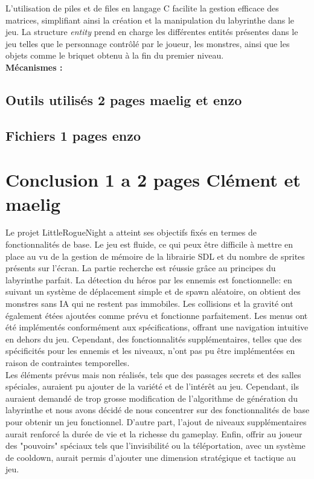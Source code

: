 \documentclass[10pt]{article}
\begin{document}
   L'utilisation de piles et de files en langage C facilite la gestion efficace des matrices, simplifiant ainsi la création et la manipulation du 
   labyrinthe dans le jeu. La structure \textit{entity} prend en charge les différentes entités présentes dans le jeu telles que le personnage contrôlé 
   par le joueur, les monstres, ainsi que les objets comme le briquet obtenu à la fin du premier niveau.\\


   \textbf{Mécanismes :}\\
   \subsection{Outils utilisés 2 pages maelig et enzo}
   \subsection{Fichiers 1 pages enzo}
   
\section{Conclusion 1 a 2 pages Clément et maelig}

Le projet LittleRogueNight a atteint ses objectifs fixés en termes de fonctionnalités de base. Le jeu est fluide, ce qui peux être difficile à mettre en place au vu de la gestion de mémoire de la librairie SDL et du nombre de sprites présents sur l'écran. La partie recherche est réussie grâce au principes du labyrinthe parfait. La détection du héros par les ennemis est fonctionnelle: en suivant un système de déplacement simple et de spawn aléatoire, on obtient des monstres sans IA qui ne restent pas immobiles. Les collisions et la gravité ont également étées ajoutées comme prévu et fonctionne parfaitement. Les menus ont été implémentés conformément aux spécifications, offrant une navigation intuitive en dehors du jeu. Cependant, des fonctionnalités supplémentaires, telles que des spécificités pour les ennemis et les niveaux, n'ont pas pu être implémentées en raison de contraintes temporelles.\\

Les éléments prévus mais non réalisés, tels que des passages secrets et des salles spéciales, auraient pu ajouter de la variété et de l'intérêt au jeu. Cependant, ils auraient demandé de trop grosse modification de l'algorithme de génération du labyrinthe et nous avons décidé de nous concentrer sur des fonctionnalités de base pour obtenir un jeu fonctionnel. D'autre part, l'ajout de niveaux supplémentaires aurait renforcé la durée de vie et la richesse du gameplay. Enfin, offrir au joueur des "pouvoirs" spéciaux tels que l'invisibilité ou la téléportation, avec un système de cooldown, aurait permis d'ajouter une dimension stratégique et tactique au jeu.\\
\end{document}
